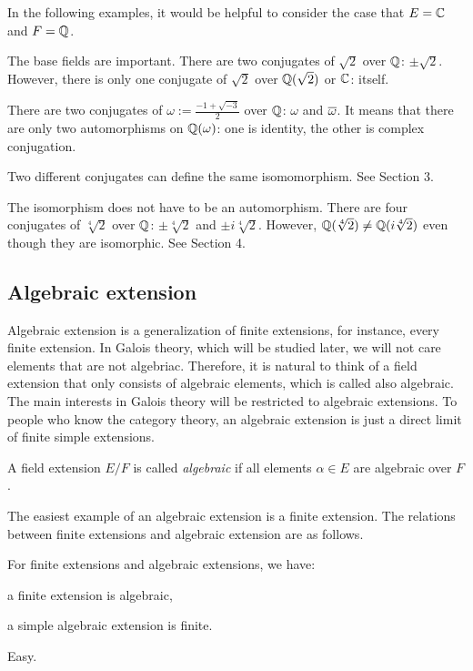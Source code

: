 \documentclass{../exp}
\begin{document}
In the following examples, it would be helpful to consider the case that $E=\mathbb{C}$ and $F=\mathbb{Q}$.
\begin{ex}
The base fields are important.
There are two conjugates of $\sqrt2$ over $\mathbb{Q}$: $\pm\sqrt2$.
However, there is only one conjugate of $\sqrt2$ over $\mathbb{Q}(\sqrt2)$ or $\mathbb{C}$: itself.
\end{ex}
\begin{ex}
There are two conjugates of $\omega:=\frac{-1+\sqrt{-3}}2$ over $\mathbb{Q}$: $\omega$ and $\overline\omega$.
It means that there are only two automorphisms on $\mathbb{Q}(\omega)$: one is identity, the other is complex conjugation.
\end{ex}
\begin{ex}
Two different conjugates can define the same isomomorphism.
See Section 3.
\end{ex}
\begin{ex}
The isomorphism does not have to be an automorphism.
There are four conjugates of $\sqrt[4]2$ over $\mathbb{Q}$: $\pm\sqrt[4]2$ and $\pm i\sqrt[4]2$.
However, $\mathbb{Q}(\sqrt[4]2)\ne\mathbb{Q}(i\sqrt[4]2)$ even though they are isomorphic.
See Section 4.
\end{ex}




\subsection{Algebraic extension}

Algebraic extension is a generalization of finite extensions, for instance, every finite extension.
In Galois theory, which will be studied later, we will not care elements that are not algebriac.
Therefore, it is natural to think of a field extension that only consists of algebraic elements, which is called also algebraic.
The main interests in Galois theory will be restricted to algebraic extensions.
To people who know the category theory, an algebraic extension is just a direct limit of finite simple extensions.

\begin{defn}
A field extension $E/F$ is called \emph{algebraic} if all elements $\alpha\in E$ are algebraic over $F$.
\end{defn}

The easiest example of an algebraic extension is a finite extension.
The relations between finite extensions and algebraic extension are as follows.

\begin{thm}
For finite extensions and algebraic extensions, we have:
\begin{cond}
\item a finite extension is algebraic,
\item a simple algebraic extension is finite.
\end{cond}
\end{thm}
\begin{pf} Easy. \end{pf}
\end{document}
